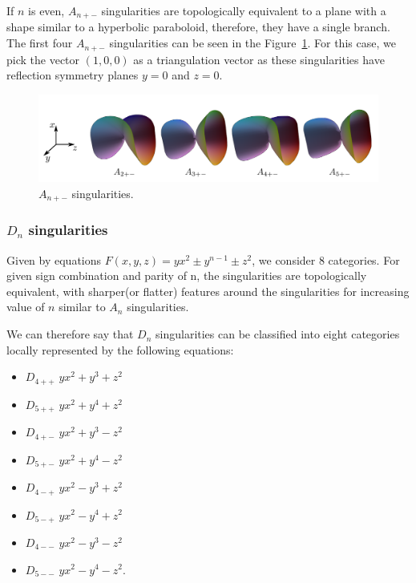 If $n$ is even, $A_{n+-}$ singularities are topologically equivalent to a plane
with a shape similar to a hyperbolic paraboloid, therefore, they have a single branch.
The first four $A_{n+-}$ singularities can be seen in the Figure~\ref{img:5}.
For this case, we pick the vector $(1, 0, 0)$ as a triangulation vector as
these singularities have reflection symmetry planes $y=0$ and $z=0$.

\begin{figure}
    \centerline{\includegraphics[scale=0.5]{images/img5}}
    \caption[$A_{n+-}$ singularities]
    {$A_{n+-}$ singularities. \cite{morris2003client}}
    \label{img:5}
\end{figure}

\subsubsection*{$D_n$ singularities}

Given by equations $F(x,y,z)=yx^2\pm y^{n-1}\pm z^2$, we consider 8 categories.
For given sign combination and parity of n, the singularities are topologically
equivalent, with sharper(or flatter) features around the singularities for increasing
value of $n$ similar to $A_n$ singularities.

We can therefore say that $D_n$ singularities can be classified into eight categories
locally represented by the following equations:
\begin{itemize}
    \item $D_{4++}$ \hspace{5mm} $yx^2 + y^3 + z^2$
    \item $D_{5++}$ \hspace{5mm} $yx^2 + y^4 + z^2$
    \item $D_{4+-}$ \hspace{5mm} $yx^2 + y^3 - z^2$
    \item $D_{5+-}$ \hspace{5mm} $yx^2 + y^4 - z^2$
    \item $D_{4-+}$ \hspace{5mm} $yx^2 - y^3 + z^2$
    \item $D_{5-+}$ \hspace{5mm} $yx^2 - y^4 + z^2$
    \item $D_{4--}$ \hspace{5mm} $yx^2 - y^3 - z^2$
    \item $D_{5--}$ \hspace{5mm} $yx^2 - y^4 - z^2$.
\end{itemize}

